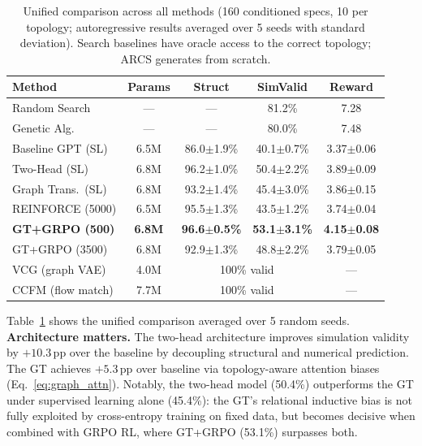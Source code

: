 \documentclass[conference]{IEEEtran}
\begin{document}
\begin{table}[t]
\centering
\caption{Unified comparison across all methods (160 conditioned specs,
10 per topology; autoregressive results averaged over 5 seeds with
standard deviation). Search baselines have oracle access to the correct
topology; ARCS generates from scratch.}
\label{tab:main}
\begin{tabular}{@{}lcccc@{}}
\toprule
Method & Params & Struct & SimValid & Reward \\
\midrule
Random Search    & --- & --- & 81.2\% & 7.28 \\
Genetic Alg.     & --- & --- & 80.0\% & 7.48 \\
\midrule
Baseline GPT (SL)     & 6.5M & 86.0{\tiny$\pm$1.9}\% & 40.1{\tiny$\pm$0.7}\% & 3.37{\tiny$\pm$0.06} \\
Two-Head (SL)         & 6.8M & 96.2{\tiny$\pm$1.0}\% & 50.4{\tiny$\pm$2.2}\% & 3.89{\tiny$\pm$0.09} \\
Graph Trans.\ (SL)    & 6.8M & 93.2{\tiny$\pm$1.4}\% & 45.4{\tiny$\pm$3.0}\% & 3.86{\tiny$\pm$0.15} \\
REINFORCE (5000)      & 6.5M & 95.5{\tiny$\pm$1.3}\% & 43.5{\tiny$\pm$1.2}\% & 3.74{\tiny$\pm$0.04} \\
\textbf{GT+GRPO (500)}  & \textbf{6.8M} & \textbf{96.6{\tiny$\pm$0.5}\%} & \textbf{53.1{\tiny$\pm$3.1}\%} & \textbf{4.15{\tiny$\pm$0.08}} \\
GT+GRPO (3500)        & 6.8M & 92.9{\tiny$\pm$1.3}\% & 48.8{\tiny$\pm$2.2}\% & 3.79{\tiny$\pm$0.05} \\
\midrule
VCG (graph VAE)   & 4.0M & \multicolumn{2}{c}{100\% valid} & --- \\
CCFM (flow match) & 7.7M & \multicolumn{2}{c}{100\% valid} & --- \\
\bottomrule
\end{tabular}
\end{table}

Table~\ref{tab:main} shows the unified comparison averaged over 5
random seeds.
\textbf{Architecture matters.} The two-head architecture improves
simulation validity by $+10.3$\,pp over the baseline by decoupling
structural and numerical prediction. The GT achieves
$+5.3$\,pp over baseline via topology-aware attention biases
(Eq.~\ref{eq:graph_attn}). Notably, the two-head model (50.4\%) outperforms
the GT under supervised learning alone (45.4\%): the GT's
relational inductive bias is not fully exploited by cross-entropy training
on fixed data, but becomes decisive when combined with GRPO
RL, where GT+GRPO (53.1\%) surpasses both.
\end{document}
